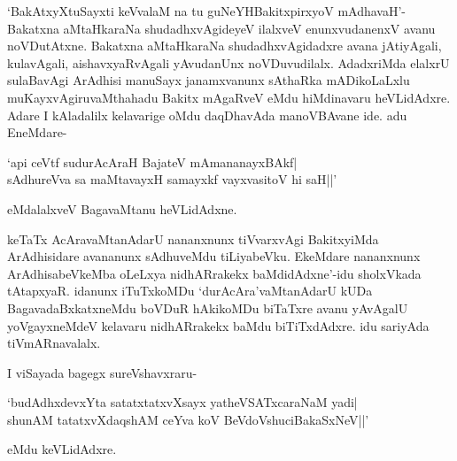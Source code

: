 `BakAtxyXtuSayxti keVvalaM na tu guNeYHBakitxpirxyoV mAdhavaH'-Bakatxna aMtaHkaraNa shudadhxvAgideyeV ilalxveV enunxvudanenxV avanu noVDutAtxne. Bakatxna aMtaHkaraNa shudadhxvAgidadxre avana jAtiyAgali, kulavAgali, aishavxyaRvAgali yAvudanUnx noVDuvudilalx. AdadxriMda elalxrU sulaBavAgi ArAdhisi manuSayx janamxvanunx sAthaRka mADikoLaLxlu muKayxvAgiruvaMthahadu Bakitx mAgaRveV eMdu hiMdinavaru heVLidAdxre. Adare I kAladalilx kelavarige oMdu daqDhavAda manoVBAvane ide. adu EneMdare-

\begin{shloka}
`api ceVtf sudurAcAraH BajateV mAmananayxBAkf|\\
sAdhureVva sa maMtavayxH samayxkf vayxvasitoV hi saH||'
\end{shloka}

\noindent eMdalalxveV BagavaMtanu heVLidAdxne.

keTaTx AcAravaMtanAdarU nananxnunx tiVvarxvAgi BakitxyiMda ArAdhisidare avananunx sAdhuveMdu tiLiyabeVku. EkeMdare nananxnunx ArAdhisabeVkeMba oLeLxya nidhARrakekx baMdidAdxne'-idu sholxVkada tAtapxyaR. idanunx iTuTxkoMDu `durAcAra'vaMtanAdarU kUDa BagavadaBxkatxneMdu boVDuR hAkikoMDu biTaTxre avanu yAvAgalU yoVgayxneMdeV kelavaru nidhARrakekx baMdu biTiTxdAdxre. idu sariyAda tiVmARnavalalx.

I viSayada bagegx sureVshavxraru-

\begin{shloka}
`budAdhxdevxYta satatxtatxvXsayx yatheVSATxcaraNaM yadi|\\
shunAM tatatxvXdaqshAM ceYva koV BeVdoV\s shuciBakaSxNeV||'
\end{shloka}

\noindent eMdu keVLidAdxre.

